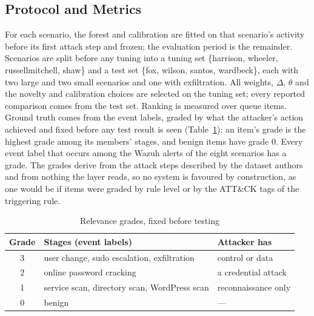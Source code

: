 \documentclass[conference]{IEEEtran}
\begin{document}
\subsection{Protocol and Metrics}
\label{sec:protocol}

For each scenario, the forest and calibration are fitted on that scenario's activity before its first attack step and frozen; the evaluation period is the remainder. Scenarios are split before any tuning into a tuning set \{harrison, wheeler, russellmitchell, shaw\} and a test set \{fox, wilson, santos, wardbeck\}, each with two large and two small scenarios and one with exfiltration. All weights, $\Delta$, $\theta$ and the novelty and calibration choices are selected on the tuning set; every reported comparison comes from the test set. Ranking is measured over queue items. Ground truth comes from the event labels, graded by what the attacker's action achieved and fixed before any test result is seen (Table~\ref{tab:grades}): an item's grade is the highest grade among its members' stages, and benign items have grade 0. Every event label that occurs among the Wazuh alerts of the eight scenarios has a grade. The grades derive from the attack steps described by the dataset authors and from nothing the layer reads, so no system is favoured by construction, as one would be if items were graded by rule level or by the ATT\&CK tags of the triggering rule.

\begin{table}[t]
\caption{Relevance grades, fixed before testing}
\label{tab:grades}
\centering\footnotesize
\begin{tabular}{@{}c p{4.1cm} p{2.6cm}@{}}
\toprule
\textbf{Grade} & \textbf{Stages (event labels)} & \textbf{Attacker has} \\
\midrule
3 & user change, sudo escalation, exfiltration & control or data \\
2 & online password cracking & a credential attack \\
1 & service scan, directory scan, WordPress scan & reconnaissance only \\
0 & benign & --- \\
\bottomrule
\end{tabular}
\end{table}
\end{document}

